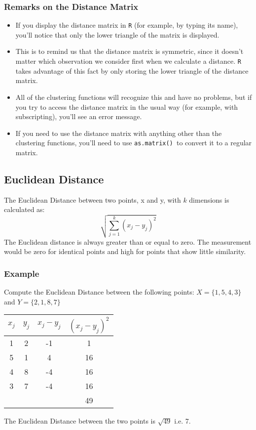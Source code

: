 \documentclass[12pt]{article}
\begin{document}
\newpage
\subsubsection*{Remarks on the Distance Matrix}
\begin{itemize}
	\item If you display the distance matrix in \texttt{R} (for example, by typing its name), you'll notice that only the lower triangle of the matrix is displayed. 
	\item This is to remind us that the distance matrix is symmetric, since it doesn't matter which observation we consider first when we calculate a distance. \texttt{R} takes advantage of this fact by only storing the lower triangle of the distance matrix. 
	\item All of the clustering functions will recognize this and have no problems, but if you try to access the distance matrix in the usual way (for example, with subscripting), you'll see an error message. 
	\item If you need to use the distance matrix with anything other than the clustering functions, you'll need to use \texttt{as.matrix() }to convert it to a regular matrix.
\end{itemize}
\newpage
\subsection{Euclidean Distance}
The Euclidean Distance between two points, x and y, with $k$ dimensions is calculated as:
\[ \sqrt{ \sum^{k}_{j=1} ( x_j - y_j)^2 } \]
The Euclidean distance is always greater than or equal to zero. The measurement would be zero for identical points and high for points that show little similarity.

\subsubsection{Example}
Compute the Euclidean Distance between the following points:
$X = \{1,5,4,3\}$ and $Y = \{2,1,8,7\}$

\begin{center}
	\begin{tabular}{|c|c|c|c|}
		\hline
		$x_j$	&	$y_j$	&   $x_j - y_j$	&	$(x_j - y_j)^2$	\\ \hline
		1	&	2	&	-1	&	1	\\
		5	&	1	&	4	&	16	\\
		4	&	8	&	-4	&	16	\\
		3	&	7	&	-4	&	16	\\ \hline
		&		&		&	49	\\ \hline
	\end{tabular}
\end{center}
The Euclidean Distance between the two points is $\sqrt{49}$ i.e. 7.
\end{document}
